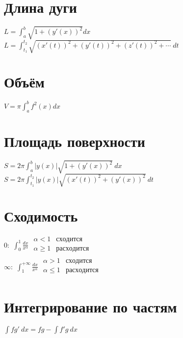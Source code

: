 \documentclass[a4paper,12pt]{article}
\newcommand{\ds}{\displaystyle}
\begin{document}
\section{Длина дуги}
$\ds L = \int_a^b \sqrt{1+(y'(x))^2} dx$ \\
$\ds L = \int_{t_1}^{t_2} \sqrt{(x'(t))^2 + (y'(t))^2 + (z'(t))^2 + \cdots}\ dt$

\section{Объём}
$\ds V = \pi \int_a^b f^2(x) dx$

\section{Площадь поверхности}
$\ds S = 2\pi \int_a^b \left|y(x)\right|\sqrt{1+(y'(x))^2}\ dx$ \\
$\ds S = 2\pi \int_{t_1}^{t_2} \left|y(x)\right|\sqrt{(x'(t))^2+(y'(x))^2}\ dt$

\section{Сходимость}
$0:$ $\ds \int_0^1 \frac{dx}{x^\alpha} $ \quad $\begin{matrix}
  \alpha < 1 & сходится \\
  \alpha \geq 1 & расходится \\
\end{matrix}$ \\ $\infty:$ $\ds \int_1^{+\infty} \frac{dx}{x^\alpha} $ \quad $\begin{matrix}
  \alpha > 1 & сходится \\
  \alpha \leq 1 & расходится \\
\end{matrix}$

\section{Интегрирование по частям}
$\ds \int f g' \ dx = fg - \int f' g \ dx$
\end{document}
